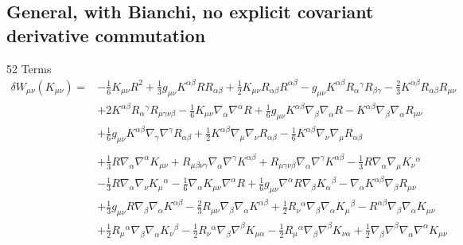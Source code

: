 \documentclass[10pt,letterpaper]{article}
\begin{document}
\subsection*{General, with Bianchi, no explicit covariant derivative commutation}
52 Terms
\begin{align}
\delta W_{\mu\nu}(K_{\mu\nu})={}&- \tfrac{1}{6} K_{\mu \nu} R^2
 + \tfrac{1}{3} g_{\mu \nu} K^{\alpha \beta} R R_{\alpha \beta}
 + \tfrac{1}{2} K_{\mu \nu} R_{\alpha \beta} R^{\alpha \beta}
 -  g_{\mu \nu} K^{\alpha \beta} R_{\alpha}{}^{\gamma} R_{\beta \gamma}
 -  \tfrac{2}{3} K^{\alpha \beta} R_{\alpha \beta} R_{\mu \nu}\nonumber\\
& + 2 K^{\alpha \beta} R_{\alpha}{}^{\gamma} R_{\mu \gamma \nu \beta}
 -  \tfrac{1}{6} K_{\mu \nu} \nabla_{\alpha}\nabla^{\alpha}R
 + \tfrac{1}{6} g_{\mu \nu} K^{\alpha \beta} \nabla_{\beta}\nabla_{\alpha}R
 -  K^{\alpha \beta} \nabla_{\beta}\nabla_{\alpha}R_{\mu \nu}\nonumber\\
& + \tfrac{1}{6} g_{\mu \nu} K^{\alpha \beta} \nabla_{\gamma}\nabla^{\gamma}R_{\alpha \beta}
 + \tfrac{1}{2} K^{\alpha \beta} \nabla_{\mu}\nabla_{\nu}R_{\alpha \beta}
 -  \tfrac{1}{6} K^{\alpha \beta} \nabla_{\nu}\nabla_{\mu}R_{\alpha \beta}\nonumber
\\ \\
&+\tfrac{1}{3} R \nabla_{\alpha}\nabla^{\alpha}K_{\mu \nu}
 + R_{\mu \beta \nu \gamma} \nabla_{\alpha}\nabla^{\gamma}K^{\alpha \beta}
 + R_{\mu \gamma \nu \beta} \nabla_{\alpha}\nabla^{\gamma}K^{\alpha \beta}
 -  \tfrac{1}{3} R \nabla_{\alpha}\nabla_{\mu}K_{\nu}{}^{\alpha}\nonumber\\
& -  \tfrac{1}{3} R \nabla_{\alpha}\nabla_{\nu}K_{\mu}{}^{\alpha}
 -  \tfrac{1}{6} \nabla_{\alpha}K_{\mu \nu} \nabla^{\alpha}R
 + \tfrac{1}{6} g_{\mu \nu} \nabla^{\alpha}R \nabla_{\beta}K_{\alpha}{}^{\beta}
 -  \nabla_{\alpha}K^{\alpha \beta} \nabla_{\beta}R_{\mu \nu}\nonumber\\
& + \tfrac{1}{3} g_{\mu \nu} R \nabla_{\beta}\nabla_{\alpha}K^{\alpha \beta}
 -  \tfrac{2}{3} R_{\mu \nu} \nabla_{\beta}\nabla_{\alpha}K^{\alpha \beta}
 + \tfrac{1}{2} R_{\nu}{}^{\alpha} \nabla_{\beta}\nabla_{\alpha}K_{\mu}{}^{\beta}
 -  R^{\alpha \beta} \nabla_{\beta}\nabla_{\alpha}K_{\mu \nu}\nonumber\\
& + \tfrac{1}{2} R_{\mu}{}^{\alpha} \nabla_{\beta}\nabla_{\alpha}K_{\nu}{}^{\beta}
 -  \tfrac{1}{2} R_{\nu}{}^{\alpha} \nabla_{\beta}\nabla^{\beta}K_{\mu \alpha}
 -  \tfrac{1}{2} R_{\mu}{}^{\alpha} \nabla_{\beta}\nabla^{\beta}K_{\nu \alpha}
 + \tfrac{1}{2} \nabla_{\beta}\nabla^{\beta}\nabla_{\alpha}\nabla^{\alpha}K_{\mu \nu}\nonumber\\

\end{align}
\end{document}
